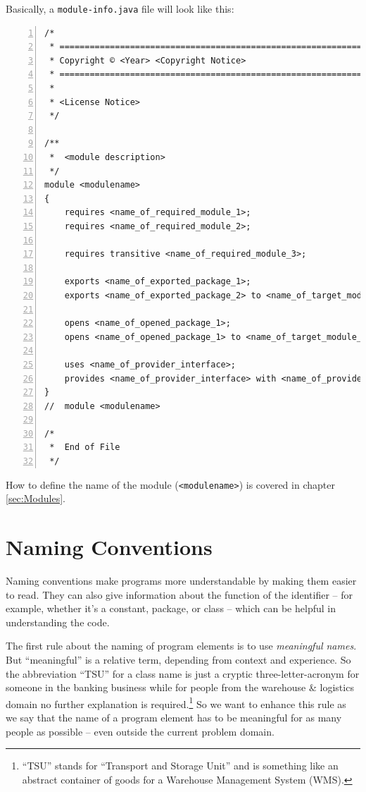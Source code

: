 \documentclass[12pt,a4paper,titlepage, parskip=half, headsepline, footsepline, cleardoubleplain]{scrbook}
\begin{document}
Basically, a \verb#module-info.java# file will look like this:
\begin{lstlisting}[numbers=left, caption={module-info.java}]
/*
 * ==================================================================
 * Copyright © <Year> <Copyright Notice>
 * ==================================================================
 *
 * <License Notice>
 */
 
/**
 *  <module description>
 */ 
module <modulename> 
{
    requires <name_of_required_module_1>;
    requires <name_of_required_module_2>;

    requires transitive <name_of_required_module_3>;

    exports <name_of_exported_package_1>;
    exports <name_of_exported_package_2> to <name_of_target_module_1>;

    opens <name_of_opened_package_1>;
    opens <name_of_opened_package_1> to <name_of_target_module_1>, <name_of_target_module_2>;

    uses <name_of_provider_interface>;
    provides <name_of_provider_interface> with <name_of_provider_implementation>;
}
//  module <modulename>

/*
 *  End of File
 */
\end{lstlisting}
How to define the name of the module (\lstinline|<modulename>|) is covered in chapter \vref{sec:Modules}.

\chapter{Naming Conventions}
Naming conventions make programs more understandable by making them easier to read. They can also give information about the function of the identifier – for example, whether it's a constant, package, or class – which can be helpful in understanding the code.

The first rule about the naming of program elements is to use \textit{meaningful names}. But “meaningful” is a relative term, depending from context and experience. So the abbreviation “TSU” for a class name is just a cryptic three-letter-acronym for someone in the banking business while for people from the warehouse \& logistics domain no further explanation is required.\footnote{“TSU” stands for “Transport and Storage Unit” and is something like an abstract container of goods for a Warehouse Management System (WMS).} So we want to enhance this rule as we say that the name of a program element has to be meaningful for as many people as possible – even outside the current problem domain.
\end{document}
